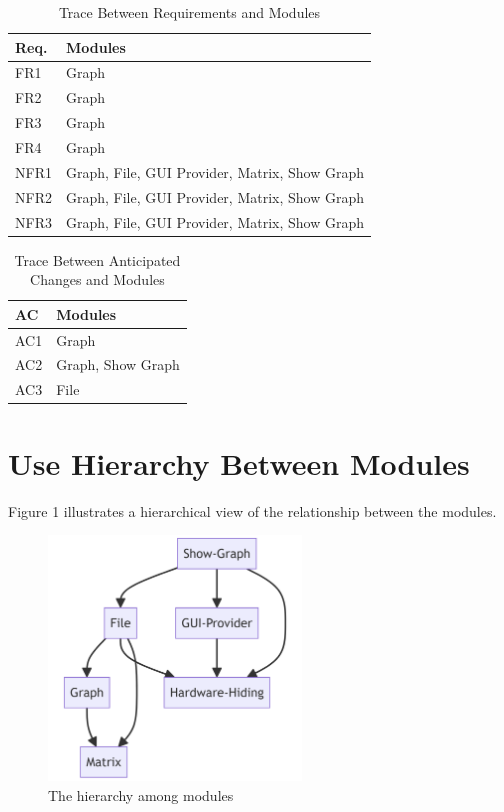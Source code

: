 \documentclass[12pt, titlepage]{article}
\begin{document}
\begin{table}[H]
\centering
\begin{tabular}{p{} p{}}
\toprule
\textbf{Req.} & \textbf{Modules}\\
\midrule
FR1 & Graph \\
FR2 & Graph\\
FR3 & Graph\\
FR4 & Graph\\
NFR1 & Graph, File, GUI Provider, Matrix, Show Graph\\
NFR2 & Graph, File, GUI Provider, Matrix, Show Graph\\
NFR3 & Graph, File, GUI Provider, Matrix, Show Graph\\
\bottomrule
\end{tabular}
\caption{Trace Between Requirements and Modules}
\label{TblRT}
\end{table}

\begin{table}[H]
\centering
\begin{tabular}{p{} p{}}
\toprule
\textbf{AC} & \textbf{Modules}\\
\midrule
AC1 & Graph\\
AC2 &Graph, Show Graph\\
AC3 & File\\
\bottomrule
\end{tabular}
\caption{Trace Between Anticipated Changes and Modules}
\label{TblACT}
\end{table}

\section{Use Hierarchy Between Modules} \label{SecUse}

Figure 1 illustrates a hierarchical view of the relationship between the modules.
\begin{figure}[h!]
\begin{center}
 \includegraphics[width=0.6\textwidth]{GRAPH}
\caption{The hierarchy among modules}
\label{Fig_SystemContext} 
\end{center}
\end{figure}
\end{document}
